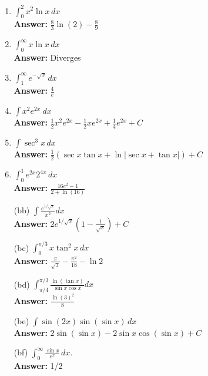 \documentclass[letterpaper]{article}
\begin{document}
\begin{enumerate}
\begin{enumerate}
	\item $\int_0^2 x^2 \ln x\,dx$
	\\ \textbf{Answer:} $\frac{8}{3}\ln(2)-\frac{8}{9}$

	\item $\int_0^\infty x\ln x\,dx$
	\\ \textbf{Answer:} Diverges

	\item $\int_1^\infty e^{-\sqrt x}\,dx$
	\\ \textbf{Answer:} $\frac{4}{e}$

	\item $\int x^2 e^{2x}~dx$
	\\ \textbf{Answer:} $\frac12 x^2 e^{2x}- \frac12xe^{2x}+\frac14e^{2x}+C$

	\item $\int \sec^3 x\,dx$
	\\ \textbf{Answer:} $\frac{1}{2}\left(\sec x \tan x + \ln | \sec x + \tan x| \right)+C$

	\item $\int_0^1 e^{2x}2^{4x}\,dx$
	\\ \textbf{Answer:} $\frac{16e^2-1}{2+\ln(16)}$

	\item[(bb)] $\int \frac{e^{1/\sqrt{x}}}{x^2}dx$
	\\ \textbf{Answer:} $2e^{1/\sqrt{x}}\left(1-\frac{1}{\sqrt x}\right)+C$

	\item[(bc)] $\int_0^{\pi/3} x\tan^2 x\,dx$
	\\ \textbf{Answer:} $\frac{\pi}{\sqrt{3}}-\frac{\pi^2}{18}-\ln 2$

	\item[(bd)] $\int_{\pi/4}^{\pi/3} \frac{\ln(\tan x)}{\sin x \cos x}dx$
	\\ \textbf{Answer:} $\frac{\ln(3)^2}{8}$

	\item[(be)] $\int \sin(2x)\sin(\sin x)\,dx$
	\\ \textbf{Answer:} $2\sin(\sin x)-2\sin x\cos(\sin x)+C$

	\item[(bf)] $\int_0^\infty \frac{\sin x}{e^x}\,dx$.
	\\ \textbf{Answer:} 1/2
	\end{enumerate}


\end{enumerate}
\end{document}
